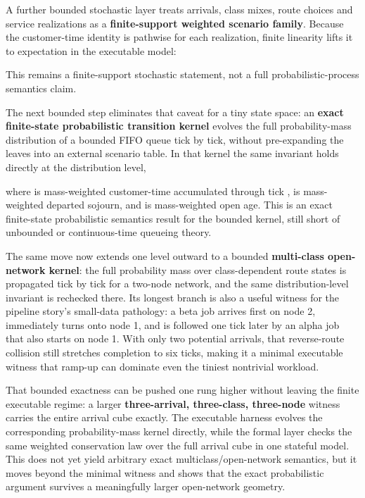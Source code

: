 \documentclass[
]{article}
\begin{document}
A further bounded stochastic layer treats arrivals, class mixes, route
choices and service realizations as a \textbf{finite-support weighted
scenario family}. Because the customer-time identity is pathwise for
each realization, finite linearity lifts it to expectation in the
executable model:

This remains a finite-support stochastic statement, not a full
probabilistic-process semantics claim.

The next bounded step eliminates that caveat for a tiny state space: an
\textbf{exact finite-state probabilistic transition kernel} evolves the
full probability-mass distribution of a bounded FIFO queue tick by tick,
without pre-expanding the leaves into an external scenario table. In
that kernel the same invariant holds directly at the distribution level,

where is mass-weighted customer-time accumulated through tick , is
mass-weighted departed sojourn, and is mass-weighted open age. This is
an exact finite-state probabilistic semantics result for the bounded
kernel, still short of unbounded or continuous-time queueing theory.

The same move now extends one level outward to a bounded
\textbf{multi-class open-network kernel}: the full probability mass over
class-dependent route states is propagated tick by tick for a two-node
network, and the same distribution-level invariant is rechecked there.
Its longest branch is also a useful witness for the pipeline story's
small-data pathology: a beta job arrives first on node 2, immediately
turns onto node 1, and is followed one tick later by an alpha job that
also starts on node 1. With only two potential arrivals, that
reverse-route collision still stretches completion to six ticks, making
it a minimal executable witness that ramp-up can dominate even the
tiniest nontrivial workload.

That bounded exactness can be pushed one rung higher without leaving the
finite executable regime: a larger \textbf{three-arrival, three-class,
three-node} witness carries the entire arrival cube exactly. The
executable harness evolves the corresponding probability-mass kernel
directly, while the formal layer checks the same weighted conservation
law over the full arrival cube in one stateful model. This does not yet
yield arbitrary exact multiclass/open-network semantics, but it moves
beyond the minimal witness and shows that the exact probabilistic
argument survives a meaningfully larger open-network geometry.
\end{document}
